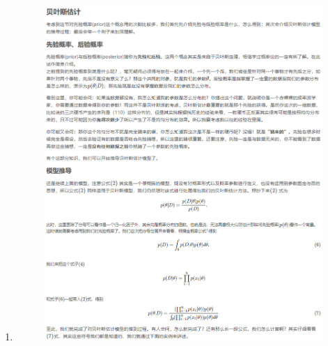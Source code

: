\documentclass[12pt]{ctexart}%
\begin{document}
\begin{enumerate}
			\item[] 
				\begin{figure}[H]
					\vspace{-0.2cm}  %
					\centering
					\includegraphics[scale=0.8]{derivation_bayes.png}
					\renewcommand{\figurename}{Fig} %
				\end{figure}
			

\end{enumerate}
\end{document}
